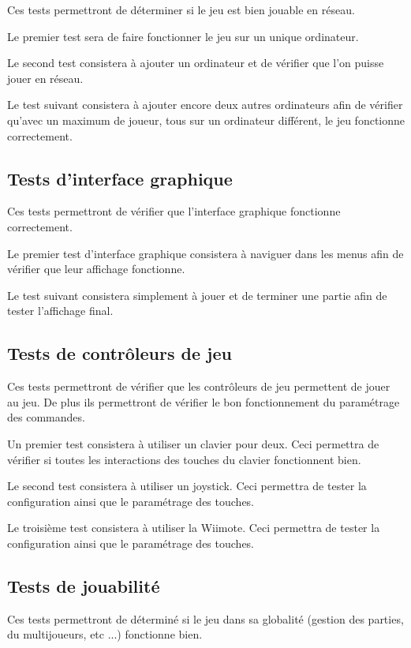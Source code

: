 Ces tests permettront de déterminer si le jeu est bien jouable en réseau.

Le premier test sera de faire fonctionner le jeu sur un unique ordinateur.

Le second test consistera à ajouter un ordinateur et de vérifier que l'on puisse jouer en réseau.

Le test suivant consistera à ajouter encore deux autres ordinateurs afin de vérifier qu'avec un maximum de joueur, tous sur un ordinateur différent, le jeu fonctionne correctement.

\subsection{Tests d'interface graphique}

Ces tests permettront de vérifier que l'interface graphique fonctionne correctement.

Le premier test d'interface graphique consistera à naviguer dans les menus afin de vérifier que leur affichage fonctionne.

Le test suivant consistera simplement à jouer et de terminer une partie afin de tester l'affichage final.

\subsection{Tests de contrôleurs de jeu}

Ces tests permettront de vérifier que les contrôleurs de jeu permettent de jouer au jeu. De plus ils permettront de vérifier le bon fonctionnement du paramétrage des commandes.

Un premier test consistera à utiliser un clavier pour deux. Ceci permettra de vérifier si toutes les interactions des touches du clavier fonctionnent bien.

Le second test consistera à utiliser un joystick. Ceci permettra de tester la configuration ainsi que le paramétrage des touches.

Le troisième test consistera à utiliser la Wiimote. Ceci permettra de tester la configuration ainsi que le paramétrage des touches.

\subsection{Tests de jouabilité}

Ces tests permettront de déterminé si le jeu dans sa globalité (gestion des parties, du multijoueurs, etc ...) fonctionne bien.

